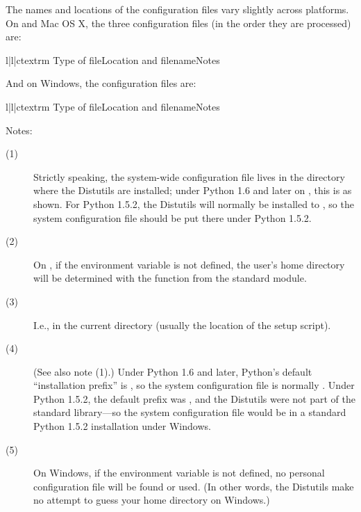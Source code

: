 \documentclass{howto}
\begin{document}
The names and locations of the configuration files vary slightly across
platforms.  On \UNIX{} and Mac OS X, the three configuration files (in
the order they are processed) are:
\begin{tableiii}{l|l|c}{textrm}
  {Type of file}{Location and filename}{Notes}
\end{tableiii}

And on Windows, the configuration files are:
\begin{tableiii}{l|l|c}{textrm}
  {Type of file}{Location and filename}{Notes}
\end{tableiii}

\noindent Notes:
\begin{description}
\item[(1)] Strictly speaking, the system-wide configuration file lives
  in the directory where the Distutils are installed; under Python 1.6
  and later on \UNIX, this is as shown. For Python 1.5.2, the Distutils
  will normally be installed to
  ,
  so the system configuration file should be put there under Python
  1.5.2.
\item[(2)] On \UNIX, if the  environment variable is not
  defined, the user's home directory will be determined with the
   function from the standard
   module.
\item[(3)] I.e., in the current directory (usually the location of the
  setup script).
\item[(4)] (See also note (1).)  Under Python 1.6 and later, Python's
  default ``installation prefix'' is , so
  the system configuration file is normally
  .
  Under Python 1.5.2, the default prefix was
  , and the
  Distutils were not part of the standard library---so the system
  configuration file would be
  in a standard Python 1.5.2 installation under Windows.
\item[(5)] On Windows, if the  environment variable is not
  defined, no personal configuration file will be found or used.  (In
  other words, the Distutils make no attempt to guess your home
  directory on Windows.)
\end{description}
\end{document}
